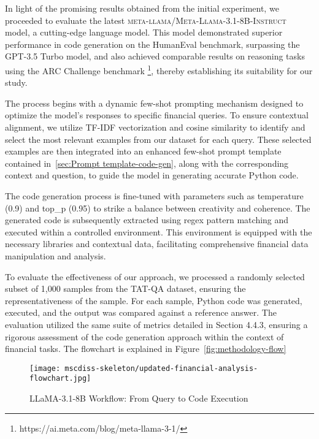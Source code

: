\documentclass[logo,msc]{infthesis}           %
\begin{document}
In light of the promising results obtained from the initial experiment, we proceeded to evaluate the latest \textsc{meta-llama/Meta-Llama-3.1-8B-Instruct} model, a cutting-edge language model. This model demonstrated superior performance in code generation on the HumanEval benchmark, surpassing the GPT-3.5 Turbo model, and also achieved comparable results on reasoning tasks using the ARC Challenge benchmark \footnote{https://ai.meta.com/blog/meta-llama-3-1/}, thereby establishing its suitability for our study.

The process begins with a dynamic few-shot prompting mechanism designed to optimize the model's responses to specific financial queries. To ensure contextual alignment, we utilize TF-IDF vectorization and cosine similarity to identify and select the most relevant examples from our dataset for each query. These selected examples are then integrated into an enhanced few-shot prompt template contained in~\ref{sec:Prompt template-code-gen}, along with the corresponding context and question, to guide the model in generating accurate Python code.

The code generation process is fine-tuned with parameters such as temperature (0.9) and top\_p (0.95) to strike a balance between creativity and coherence. The generated code is subsequently extracted using regex pattern matching and executed within a controlled environment. This environment is equipped with the necessary libraries and contextual data, facilitating comprehensive financial data manipulation and analysis.

To evaluate the effectiveness of our approach, we processed a randomly selected subset of 1,000 samples from the TAT-QA dataset, ensuring the representativeness of the sample. For each sample, Python code was generated, executed, and the output was compared against a reference answer. The evaluation utilized the same suite of metrics detailed in Section 4.4.3, ensuring a rigorous assessment of the code generation approach within the context of financial tasks. The flowchart is explained in Figure~\ref{fig:methodology-flow}

\begin{figure}
    \centering
    \texttt{[image: mscdiss-skeleton/updated-financial-analysis-flowchart.jpg]}
    \caption{LLaMA-3.1-8B Workflow: From Query to Code Execution}
    \label{fig:enter-label}
\end{figure}
\end{document}

